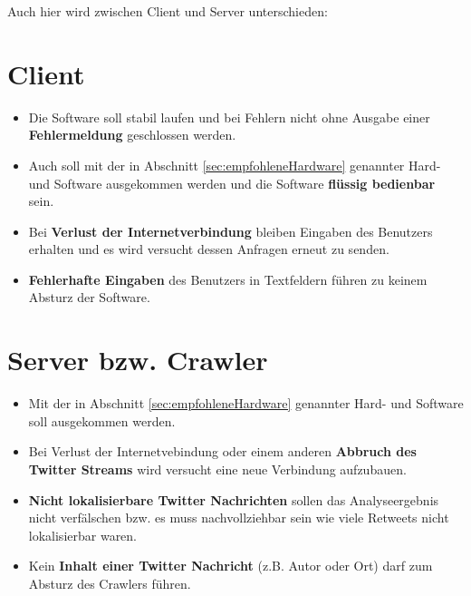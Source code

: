 Auch hier wird zwischen Client und Server unterschieden:
\section{Client}
\begin{itemize}
	\item Die Software soll stabil laufen und bei Fehlern nicht ohne Ausgabe einer \textbf{Fehlermeldung} geschlossen werden.
	\item Auch soll mit der in Abschnitt \ref{sec:empfohleneHardware} genannter Hard- und Software ausgekommen werden und die Software \textbf{flüssig bedienbar} sein.
	\item Bei \textbf{Verlust der Internetverbindung} bleiben Eingaben des Benutzers erhalten und es wird versucht dessen Anfragen erneut zu senden.
	\item \textbf{Fehlerhafte Eingaben} des Benutzers in Textfeldern führen zu keinem Absturz der Software.
\end{itemize}
\section{Server bzw. Crawler}
\begin{itemize}
	\item Mit der in Abschnitt \ref{sec:empfohleneHardware} genannter Hard- und Software soll ausgekommen werden.
	\item Bei Verlust der Internetvebindung oder einem anderen \textbf{Abbruch des Twitter Streams} wird versucht eine neue Verbindung aufzubauen.
	\item \textbf{Nicht lokalisierbare Twitter Nachrichten} sollen das Analyseergebnis nicht verfälschen bzw. es muss nachvollziehbar sein wie viele Retweets nicht lokalisierbar waren.
	\item Kein \textbf{Inhalt einer Twitter Nachricht} (z.B. Autor oder Ort) darf zum Absturz des Crawlers führen.
\end{itemize}
